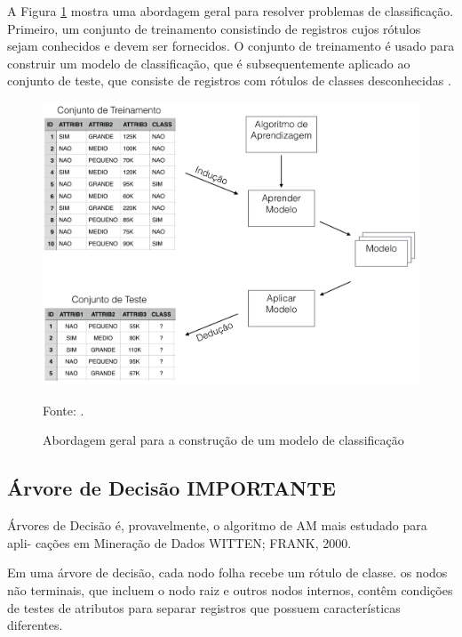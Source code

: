 \documentclass[
	12pt,				%
	openright,			%
	oneside,	
	a4paper,				%
	english,				%
	brazil				%
]{abntex2/abntex2} %
\begin{document}
	A Figura \ref{figabordagemModeloClassificacao} mostra uma abordagem geral para resolver problemas de classificação. Primeiro, um conjunto de treinamento consistindo de registros cujos rótulos sejam conhecidos e devem ser fornecidos. O conjunto de treinamento é usado para construir um modelo de classificação, que é subsequentemente aplicado ao conjunto de teste, que consiste de registros com rótulos de classes desconhecidas \cite{tan:2009}.
	\\
	\begin{figure}[!htb]
		\caption{\label{figabordagemModeloClassificacao} Abordagem geral para a construção de um modelo de classificação }
		\begin{center}
			\includegraphics[scale=0.3]{img/abordagemModeloClassificacao.png}
		\end{center}
		Fonte: \cite{tan:2009}.
	\end{figure}

	\subsection{Árvore de Decisão IMPORTANTE }
	
		Árvores de Decisão é, provavelmente, o algoritmo de AM mais estudado para apli- cações em Mineração de Dados WITTEN; FRANK, 2000.
	
		Em uma árvore de decisão, cada nodo folha recebe um rótulo de classe. os nodos não terminais, que incluem o nodo raiz e outros nodos internos, contêm condições de testes de atributos para separar registros que possuem características diferentes.
		
\end{document}
